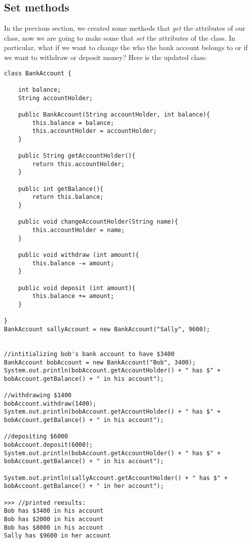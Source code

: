 \documentclass[14pt]{extreport}%
\begin{document}
\subsection*{Set methods}
In the previous section, we created some methods that \textit{get} the attributes of our class, now we are going to make some that \textit{set} the attributes of the class. In particular, what if we want to change the who the bank account belongs to or if we want to withdraw or deposit money? Here is the updated class:
\begin{lstlisting}
class BankAccount {
      
    int balance;
    String accountHolder;

    public BankAccount(String accountHolder, int balance){
        this.balance = balance;
        this.accountHolder = accountHolder;
    }

    public String getAccountHolder(){
        return this.accountHolder;
    }

    public int getBalance(){
        return this.balance;
    }

    public void changeAccountHolder(String name){
        this.accountHolder = name;
    }

    public void withdraw (int amount){
        this.balance -= amount;
    }

    public void deposit (int amount){
        this.balance += amount;
    }

}
BankAccount sallyAccount = new BankAccount("Sally", 9600);


//intitializing bob's bank account to have $3400
BankAccount bobAccount = new BankAccount("Bob", 3400);
System.out.println(bobAccount.getAccountHolder() + " has $" + bobAccount.getBalance() + " in his account");

//withdrawing $1400
bobAccount.withdraw(1400);
System.out.println(bobAccount.getAccountHolder() + " has $" + bobAccount.getBalance() + " in his account");

//depositing $6000
bobAccount.deposit(6000);
System.out.println(bobAccount.getAccountHolder() + " has $" + bobAccount.getBalance() + " in his account");

System.out.println(sallyAccount.getAccountHolder() + " has $" + bobAccount.getBalance() + " in her account");

>>> //printed reesults:
Bob has $3400 in his account
Bob has $2000 in his account
Bob has $8000 in his account
Sally has $9600 in her account
\end{lstlisting}{}
\end{document}
